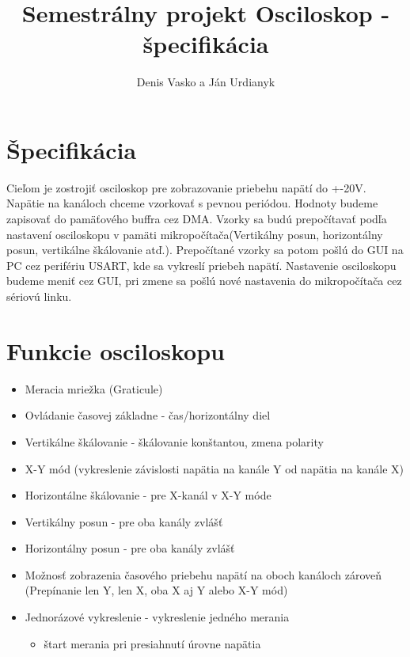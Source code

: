 \documentclass{article}
\begin{document}
	\title{ Semestrálny projekt Osciloskop - špecifikácia }
	\author{Denis Vasko a Ján Urdianyk} 
	\maketitle
	\thispagestyle{empty}
	\section{Špecifikácia}
	Cieľom je zostrojiť osciloskop pre zobrazovanie priebehu napätí do +-20V. Napätie na kanáloch chceme vzorkovať s pevnou periódou. Hodnoty budeme zapisovať do pamäťového buffra cez DMA. Vzorky sa budú prepočítavať podľa nastavení osciloskopu v pamäti mikropočítača(Vertikálny posun, horizontálny posun, vertikálne škálovanie atď.). Prepočítané vzorky sa potom pošlú do GUI na PC cez perifériu USART, kde sa vykreslí priebeh napätí. Nastavenie osciloskopu budeme meniť cez GUI, pri zmene sa pošlú nové nastavenia do mikropočítača cez sériovú linku.
\section{Funkcie osciloskopu}
\begin{itemize}
	\item Meracia mriežka (Graticule) 
	\item Ovládanie časovej základne - čas/horizontálny diel
	\item Vertikálne škálovanie - škálovanie konštantou, zmena polarity
	\item X-Y mód (vykreslenie závislosti napätia na kanále Y od napätia na kanále X)
	\item Horizontálne škálovanie - pre X-kanál v X-Y móde
	\item Vertikálny posun - pre oba kanály zvlášť
	\item Horizontálny posun - pre oba kanály zvlášť
	\item Možnosť zobrazenia časového priebehu napätí na oboch kanáloch zároveň (Prepínanie len Y, len X, oba X aj Y alebo X-Y mód)
	\item Jednorázové vykreslenie - vykreslenie jedného merania 
	\begin{itemize}
		\item štart merania pri presiahnutí úrovne napätia
	\end{itemize}
\end{itemize} 
\end{document}
